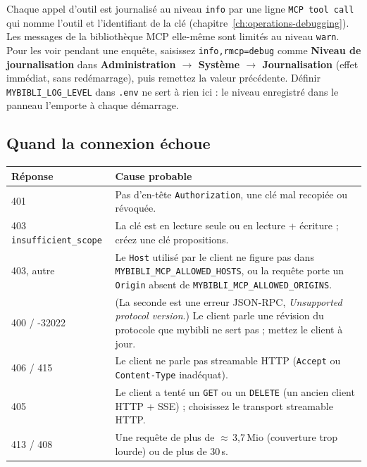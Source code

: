 Chaque appel d'outil est journalisé au niveau \texttt{info} par une
ligne \texttt{MCP tool call} qui nomme l'outil et l'identifiant de la
clé (chapitre~\ref{ch:operations-debugging}). Les messages de la
bibliothèque MCP elle-même sont limités au niveau \texttt{warn}. Pour
les voir pendant une enquête, saisissez \texttt{info,rmcp=debug} comme
\textbf{Niveau de journalisation} dans \textbf{Administration
\(\rightarrow\) Système \(\rightarrow\) Journalisation} (effet
immédiat, sans redémarrage), puis remettez la valeur précédente.
Définir \texttt{MYBIBLI\_LOG\_LEVEL} dans \texttt{.env} ne sert à
rien ici : le niveau enregistré dans le panneau l'emporte à chaque
démarrage.

\subsection{Quand la connexion échoue}

\begin{center}\small
\begin{tabular}{@{} l >{\raggedright\arraybackslash}p{10cm} @{}}
\toprule
\textbf{Réponse} & \textbf{Cause probable} \\
\midrule
401 & Pas d'en-tête \texttt{Authorization}, une clé mal recopiée ou
      révoquée. \\
403 \texttt{insufficient\_scope} & La clé est en lecture seule ou en
      lecture + écriture ; créez une clé propositions. \\
403, autre & Le \texttt{Host} utilisé par le client ne figure pas
      dans \texttt{MYBIBLI\_MCP\_ALLOWED\_HOSTS}, ou la requête porte
      un \texttt{Origin} absent de
      \texttt{MYBIBLI\_MCP\_ALLOWED\_ORIGINS}. \\
400 / -32022 & (La seconde est une erreur JSON-RPC,
      \emph{Unsupported protocol version}.) Le client parle une révision du protocole que mybibli ne sert pas ; mettez
      le client à jour. \\
406 / 415 & Le client ne parle pas streamable HTTP (\texttt{Accept}
      ou \texttt{Content-Type} inadéquat). \\
405 & Le client a tenté un \texttt{GET} ou un \texttt{DELETE} (un
      ancien client HTTP + SSE) ; choisissez le transport streamable
      HTTP. \\
413 / 408 & Une requête de plus de $\approx$\,3,7\,Mio (couverture
      trop lourde) ou de plus de 30\,s. \\
\bottomrule
\end{tabular}
\end{center}

